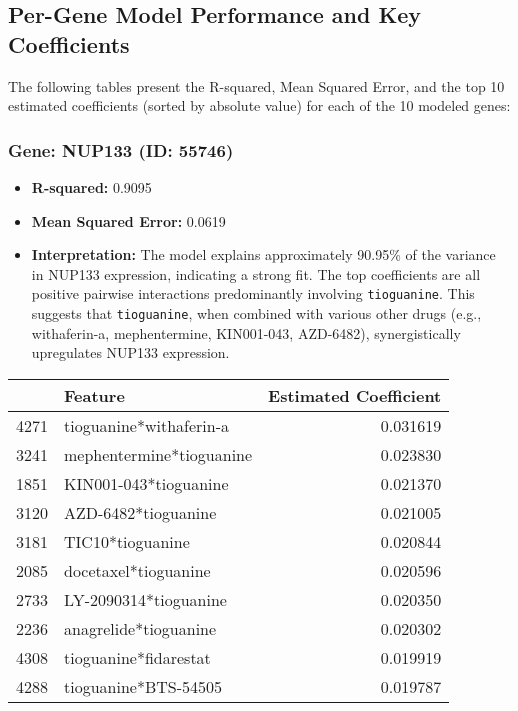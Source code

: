 \documentclass[12pt]{article}
\begin{document}
\subsection{Per-Gene Model Performance and Key Coefficients}

The following tables present the R-squared, Mean Squared Error, and the top 10 estimated coefficients (sorted by absolute value) for each of the 10 modeled genes:

\subsubsection{Gene: NUP133 (ID: 55746)}
\begin{itemize}
    \item \textbf{R-squared:} 0.9095
    \item \textbf{Mean Squared Error:} 0.0619
    \item \textbf{Interpretation:} The model explains approximately 90.95\% of the variance in NUP133 expression, indicating a strong fit. The top coefficients are all positive pairwise interactions predominantly involving \texttt{tioguanine}. This suggests that \texttt{tioguanine}, when combined with various other drugs (e.g., withaferin-a, mephentermine, KIN001-043, AZD-6482), synergistically upregulates NUP133 expression.
\end{itemize}
\begin{tabularx}{\textwidth}{l X r}
\toprule
{} & Feature & Estimated Coefficient \\
\midrule
4271 & tioguanine*withaferin-a & 0.031619 \\
3241 & mephentermine*tioguanine & 0.023830 \\
1851 & KIN001-043*tioguanine & 0.021370 \\
3120 & AZD-6482*tioguanine & 0.021005 \\
3181 & TIC10*tioguanine & 0.020844 \\
2085 & docetaxel*tioguanine & 0.020596 \\
2733 & LY-2090314*tioguanine & 0.020350 \\
2236 & anagrelide*tioguanine & 0.020302 \\
4308 & tioguanine*fidarestat & 0.019919 \\
4288 & tioguanine*BTS-54505 & 0.019787 \\
\bottomrule
\end{tabularx}
\end{document}
